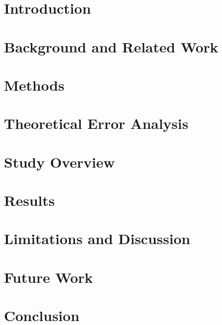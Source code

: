 
\section{Introduction}
\label{sec:introduction}


\vspace{-2mm}
\section{Background and Related Work}
\label{sec:related}


\vspace{-2mm}
\section{Methods}
\label{sec:method}


\vspace{-2mm}
\section{Theoretical Error Analysis}
\label{sec:theory}


\vspace{-2mm}
\section{Study Overview }
\label{sec:study}


\section{Results}
\label{sec:results}


%
\section{Limitations and Discussion}
\label{sec:limitations}


\section{Future Work}
\label{sec:futurework}


\section{Conclusion}
\label{sec:conclusion}

